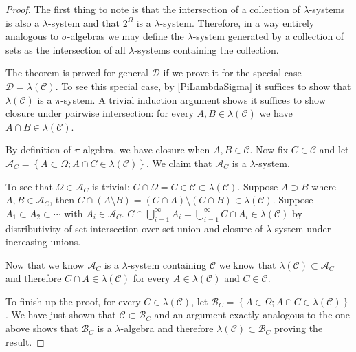 \begin{proof}The first thing to note is that the intersection of a
  collection of $\lambda$-systems is also a $\lambda$-system and that
   $2^\Omega$ is a $\lambda$-system.
  Therefore, in a way entirely analogous to $\sigma$-algebras we may
  define the $\lambda$-system generated by a collection of sets as the
  intersection of all $\lambda$-systems containing the collection.

The theorem is proved for general $\mathcal{D}$ if we prove it for the
special case $\mathcal{D} = \lambda(\mathcal{C})$.  To see this
special case, by \ref{PiLambdaSigma} it suffices to show that
$\lambda(\mathcal{C})$ is a $\pi$-system.  A trivial induction
argument shows it suffices to show closure under pairwise
intersection:  for every $A,B \in \lambda(\mathcal{C})$ we have $A
\cap B \in \lambda(\mathcal{C})$.

By definition of $\pi$-algebra, we have closure when $A,B
\in \mathcal{C}$.  Now fix $C \in \mathcal{C}$ and let $\mathcal{A}_C
= \left \{A \subset \Omega ; A \cap C \in \lambda(\mathcal{C}) \right
\}$.  We claim that $\mathcal{A}_C$ is a $\lambda$-system.

To see that $\Omega \in \mathcal{A}_C$ is trivial: $C \cap \Omega
= C \in \mathcal{C} \subset \lambda(\mathcal{C})$.
Suppose $A \supset B$ where $A,B \in \mathcal{A}_C$, then $C
\cap (A \setminus B) = (C \cap A) \setminus (C \cap B) \in
\lambda(\mathcal{C})$.  Suppose $A_1 \subset A_2 \subset \cdots$ with
$A_i \in \mathcal{A}_C$.  $C \cap \bigcup_{i=1}^\infty A_i =
\bigcup_{i=1}^\infty C \cap A_i \in \lambda(\mathcal{C})$ by
distributivity of set intersection over set union and closure of $\lambda$-system under increasing unions.

Now that we know $\mathcal{A}_C$ is a $\lambda$-system containing
$\mathcal{C}$ we know that $\lambda(\mathcal{C}) \subset
\mathcal{A}_C$ and therefore $C \cap A \in \lambda(\mathcal{C})$ for
every $A \in \lambda(\mathcal{C})$ and $C \in \mathcal{C}$.

To finish up the proof, for every $C \in \lambda(\mathcal{C})$, let
$\mathcal{B}_C = \left \{ A \in \Omega ; A \cap C \in
  \lambda(\mathcal{C}) \right \}$.  We have just shown that
$\mathcal{C} \subset \mathcal{B}_C$ and an argument exactly analogous
to the one above shows that $\mathcal{B}_C$ is a $\lambda$-algebra and
therefore $\lambda(\mathcal{C}) \subset \mathcal{B}_C$ proving the result.
\end{proof}

